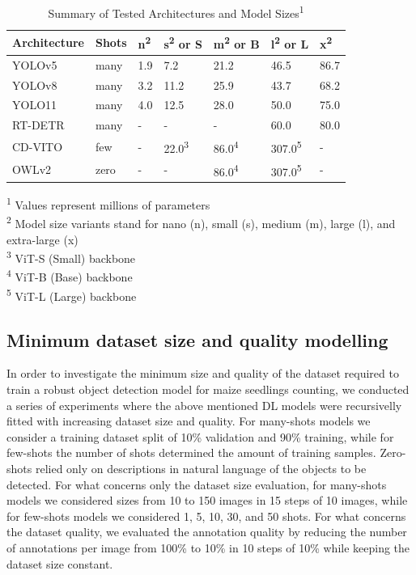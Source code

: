 \documentclass[12pt,a4paper,oneside]{report}
\begin{document}
\begin{table}[H]
  \caption{Summary of Tested Architectures and Model Sizes\textsuperscript{1}}
  \label{tab:architectures}
  \centering
  \begin{tabularx}{\textwidth}{lXXXXXX}
  \toprule
  \textbf{Architecture} &\textbf{Shots} & \textbf{n\textsuperscript{2}} & \textbf{s\textsuperscript{2} or S} & \textbf{m\textsuperscript{2} or B} & \textbf{l\textsuperscript{2} or L} & \textbf{x\textsuperscript{2}} \\
  \midrule
  YOLOv5 & many & 1.9 & 7.2 & 21.2 & 46.5 & 86.7 \\
  YOLOv8 & many & 3.2 & 11.2 & 25.9 & 43.7 & 68.2 \\
  YOLO11 & many & 4.0 & 12.5 & 28.0 & 50.0 & 75.0 \\
  RT-DETR & many & - & - & - & 60.0 & 80.0 \\
  CD-VITO & few & - & 22.0\textsuperscript{3} & 86.0\textsuperscript{4} & 307.0\textsuperscript{5} & - \\
  OWLv2 & zero & - & - & 86.0\textsuperscript{4} & 307.0\textsuperscript{5} & - \\
  \bottomrule
  \end{tabularx}
  \footnotesize{\textsuperscript{1} Values represent millions of parameters\\
  \textsuperscript{2} Model size variants stand for nano (n), small (s), medium (m), large (l), and extra-large (x)\\
  \textsuperscript{3} ViT-S (Small) backbone\\
  \textsuperscript{4} ViT-B (Base) backbone\\
  \textsuperscript{5} ViT-L (Large) backbone}
\end{table}

\subsection{Minimum dataset size and quality modelling}
In order to investigate the minimum size and quality of the dataset required to train 
a robust object detection model for maize seedlings counting, we conducted a series of experiments
where the above mentioned DL models were recursivelly fitted with increasing dataset size and quality.
For many-shots models we consider a training 
dataset split of 10\% validation and 90\% training, while for few-shots the number of shots
determined the amount of training samples. Zero-shots relied only on descriptions 
in natural language of the objects to be detected.
For what concerns only the dataset size evaluation, for many-shots models we considered
sizes from 10 to 150 images in 15 steps of 10 images, while for few-shots models we considered
1, 5, 10, 30, and 50 shots.
For what concerns the dataset quality, we evaluated the annotation quality by reducing
the number of annotations per image from 100\% to 10\% in 10 steps of 10\% while
keeping the dataset size constant.
\end{document}
